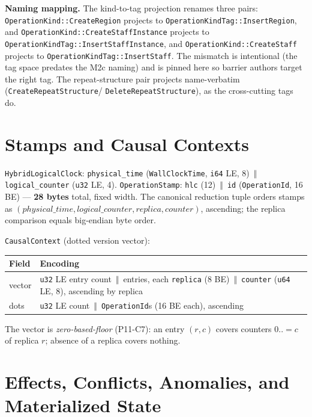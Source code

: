 \documentclass[11pt,letterpaper]{report}
\newcommand{\cat}{\ensuremath{\,\Vert\,}}
\begin{document}
\textbf{Naming mapping.} The kind-to-tag projection renames three pairs:
\texttt{OperationKind::\allowbreak CreateRegion} projects to
\texttt{OperationKindTag::\allowbreak InsertRegion}, and
\texttt{OperationKind::\allowbreak CreateStaffInstance} projects to
\texttt{OperationKindTag::\allowbreak InsertStaffInstance}, and
\texttt{OperationKind::\allowbreak CreateStaff} projects to
\texttt{OperationKindTag::\allowbreak InsertStaff}. The mismatch is
intentional
(the tag space predates the M2c naming) and is pinned here so barrier
authors target the right tag. The repeat-structure pair projects
name-verbatim (\texttt{CreateRepeatStructure}/%
\texttt{DeleteRepeatStructure}), as the cross-cutting tags do.

\section{Stamps and Causal Contexts}
\label{sec:ops:stamp}

\texttt{HybridLogicalClock}: \texttt{physical\_time} (\texttt{WallClockTime},
\texttt{i64} LE, 8) \cat{} \texttt{logical\_counter} (\texttt{u32} LE, 4).
\texttt{OperationStamp}: \texttt{hlc} (12) \cat{} \texttt{id}
(\texttt{OperationId}, 16 BE) --- \textbf{28 bytes} total, fixed width. The
canonical reduction tuple orders stamps as $(\mathit{physical\_time},
\mathit{logical\_counter}, \mathit{replica}, \mathit{counter})$, ascending;
the replica comparison equals big-endian byte order.

\label{sec:ops:causal}
\texttt{CausalContext} (dotted version vector):

\begin{center}
\begin{tabular}{p{0.7in} p{4.55in}}
  \toprule
  \textbf{Field} & \textbf{Encoding} \\
  \midrule
  vector & \texttt{u32} LE entry count \cat{} entries, each
    \texttt{replica} (8 BE) \cat{} \texttt{counter} (\texttt{u64} LE, 8),
    ascending by replica \\
  dots & \texttt{u32} LE count \cat{} \texttt{OperationId}s (16 BE each),
    ascending \\
  \bottomrule
\end{tabular}
\end{center}

The vector is \emph{zero-based-floor} (P11-C7): an entry $(r, c)$ covers
counters $0..=c$ of replica $r$; absence of a replica covers nothing.

\section{Effects, Conflicts, Anomalies, and Materialized State}
\label{sec:ops:effects}
\end{document}

